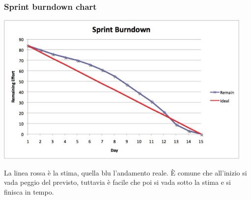 \documentclass[10pt, a4paper]{article}
\begin{document}
\subsubsection*{Sprint burndown chart}
\begin{minipage}{0.6\textwidth}
\begin{center}
\includegraphics[width=0.95\textwidth]{img/sprint_burndown.jpg}
\end{center}
\end{minipage}
\begin{minipage}{0.4\textwidth}
La linea rossa è la stima, quella blu l'andamento reale. È comune che all'inizio si vada peggio del previsto, tuttavia è facile che poi si vada sotto la stima e si finisca in tempo.
\end{minipage}
\end{document}
